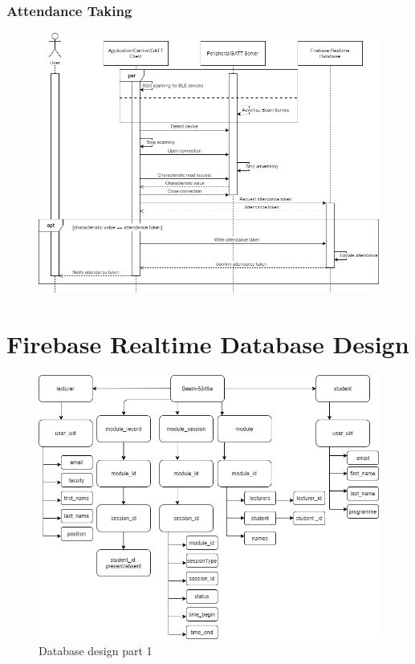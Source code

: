 \documentclass[../report.tex]{subfiles}
\begin{document}
\subsubsection{Attendance Taking}
\begin{figure}[H]
\centering
\includegraphics[width=.9\textwidth]{./images/05/07-app-attendance.png}
\label{fig:app-attendance-seq}
\end{figure}

\section{Firebase Realtime Database Design}
\begin{figure}[H]
\centering
\includegraphics[width=\textwidth]{./images/05/08-database-1.png}
\caption{Database design part 1}
\label{fig:database-design-1}
\end{figure}
\end{document}
